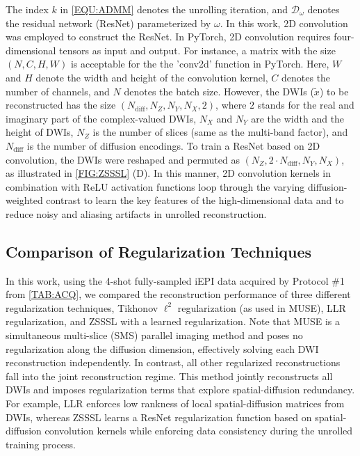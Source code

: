 \documentclass[journal,twoside,web]{ieeecolor}
\begin{document}
	The index $k$ in \cref{EQU:ADMM} denotes the unrolling iteration,
	and $\mathcal{D}_{\omega}$ denotes the residual network (ResNet) \cite{he_2016_resnet}
	parameterized by $\omega$.
	In this work, 2D convolution was employed to construct the ResNet.
	In PyTorch, 2D convolution requires four-dimensional tensors as input and output.
	For instance, a matrix with the size $(N, C, H, W)$ is acceptable
	for the the 'conv2d' function in PyTorch.
	Here, $W$ and $H$ denote the width and height of the convolution kernel,
	$C$ denotes the number of channels, and $N$ denotes the batch size.
	However, the DWIs ($\tilde{x}$) to be reconstructed
	has the size $(N_{\text{diff}}, N_Z, N_Y, N_X, 2)$,
	where $2$ stands for the real and imaginary part of the complex-valued DWIs,
	$N_X$ and $N_Y$ are the width and the height of DWIs,
	$N_Z$ is the number of slices (same as the multi-band factor), and
	$N_{\text{diff}}$ is the number of diffusion encodings.
	To train a ResNet based on 2D convolution, the DWIs were reshaped and permuted
	as $(N_Z, 2 \cdot N_{\text{diff}}, N_Y, N_X)$, as illustrated in \cref{FIG:ZSSSL} (D).
	In this manner, 2D convolution kernels in combination with ReLU activation functions
	loop through the varying diffusion-weighted contrast
	to learn the key features of the high-dimensional data and
	to reduce noisy and aliasing artifacts in unrolled reconstruction.

	\subsection{Comparison of Regularization Techniques}

	In this work, using the 4-shot fully-sampled iEPI \cite{butts_1993_iepi} data
	acquired by Protocol \#1 from \cref{TAB:ACQ},
	we compared the reconstruction performance
	of three different regularization techniques,
	Tikhonov $\ell^2$ regularization (as used in MUSE),
	LLR regularization,
	and ZSSSL with a learned regularization.
	Note that MUSE is a simultaneous multi-slice (SMS) parallel imaging method
	and poses no regularization along the diffusion dimension,
	effectively solving each DWI reconstruction independently.
	In contrast, all other regularized reconstructions
	fall into the joint reconstruction regime.
	This method jointly reconstructs all DWIs
	and imposes regularization terms that explore spatial-diffusion redundancy.
	For example, LLR enforces low rankness of local spatial-diffusion matrices from DWIs,
	whereas ZSSSL learns a ResNet regularization function
	based on spatial-diffusion convolution kernels
	while enforcing data consistency during the unrolled training process.
\end{document}
